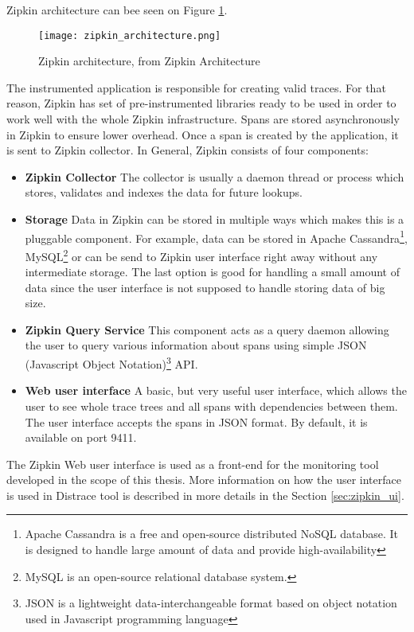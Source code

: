 Zipkin architecture can bee seen on Figure \ref{fig:zipkin_architecture}.
\begin{figure}
	\centering
	\texttt{[image: zipkin\_architecture.png]}
	\caption{Zipkin architecture, from Zipkin Architecture \cite{ZipkinImage}}
	\label{fig:zipkin_architecture}
\end{figure}
The instrumented application is responsible for creating valid traces. For that reason, Zipkin has set of pre-instrumented libraries ready to be used in order to work well with the whole Zipkin infrastructure. Spans are stored asynchronously in Zipkin to ensure lower overhead. Once a span is created by the application, it is sent to Zipkin collector. In General, Zipkin consists of four components:
\begin{itemize}
	\item \textbf{Zipkin Collector} \newline
	The collector is usually a daemon thread or process which stores, validates and indexes the data for future lookups.
	\item\textbf{Storage} \newline
	Data in Zipkin can be stored in multiple ways which makes this is a pluggable component. For example, data can be stored in Apache Cassandra\footnote{Apache Cassandra is a free and open-source distributed NoSQL database. It is designed to handle large amount of data and provide high-availability}, MySQL\footnote{MySQL is an open-source relational database system.} or can be send to Zipkin user interface right away without any intermediate storage. The last option is good for handling a small amount of data since the user interface is not supposed to handle storing data of big size.
	\item \textbf{Zipkin Query Service} \newline
	This component acts as a query daemon allowing the user to query various information about spans using simple JSON (Javascript Object Notation)\footnote{JSON is a lightweight data-interchangeable format based on object notation used in Javascript programming language} API.
	\item \textbf{Web user interface} \newline
	A basic, but very useful user interface, which allows the user to see whole trace trees and all spans with dependencies between them. The user interface accepts the spans in JSON format. By default, it is available on port 9411.
\end{itemize}
The Zipkin Web user interface is used as a front-end  for the monitoring tool developed in the scope of this thesis. More information on how the user interface is used in Distrace tool is described in more details in the Section \ref{sec:zipkin_ui}.
